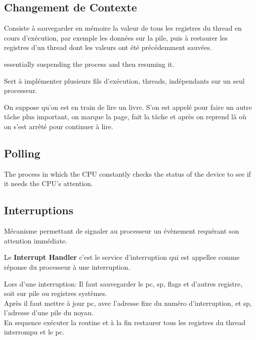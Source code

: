 \documentclass{article}
\begin{document}
\subsection{Changement de Contexte}
\begin{definition}
    Consiste à sauvegarder en mémoire la valeur de tous les registres du thread en cours d'exécution, par exemple les données sur la pile, puis à restaurer les registres d'un thread dont les valeurs ont été précédemment sauvées.

    \begin{phrase}
        essentially suspending the process and then resuming it.
    \end{phrase}

    \begin{remark}
        Sert à implémenter plusieurs fils d'exécution, threads, indépendants sur un seul processeur.
    \end{remark}

    \begin{example}
        On suppose qu'on est en train de lire un livre. S'on est appelé pour faire un autre tâche plus important, on marque la page, fait la tâche et après on reprend là où on s'est arrêté pour continuer à lire.
    \end{example}
\end{definition}


\subsection{Polling}
\begin{definition}
    The process in which the CPU constantly checks the status of the device to see if it needs the CPU's attention.
\end{definition}


\subsection{Interruptions}
\begin{definition}
    Mécanisme permettant de signaler au processeur un évènement requérant son attention immédiate.

    \begin{remark}
        Le \textbf{Interrupt Handler} c'est le service d'interruption qui est appellee comme réponse du processeur à une interruption.
    \end{remark}

    Lors d'une interruption: Il faut sauvegarder le pc, sp, flags et d'autres registre, soit sur pile ou registres systèmes.\\
    
    Après il faut mettre à jour pc, avec l'adresse fixe du numéro d'interruption, et sp, l'adresse d'une pile du noyau.\\
    
    En sequence exécuter la routine et à la fin restaurer tous les registres du thread interrompu et le pc.
\end{definition}
\end{document}
